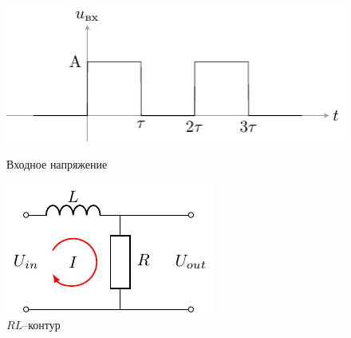\begin{figure}[h!]
\centering
\begin{minipage}{0.55\textwidth}
\centering
\includegraphics[width=\linewidth]{ris/task12_in}
\caption{Входное напряжение}
\label{fig:4figsB}
\end{minipage}
\qquad
\begin{minipage}{0.35\textwidth}
\centering
\includegraphics[width=\linewidth]{chem/task2}
\caption{$RL$--контур}
\label{fig:4figsA}
\end{minipage}
\end{figure}

